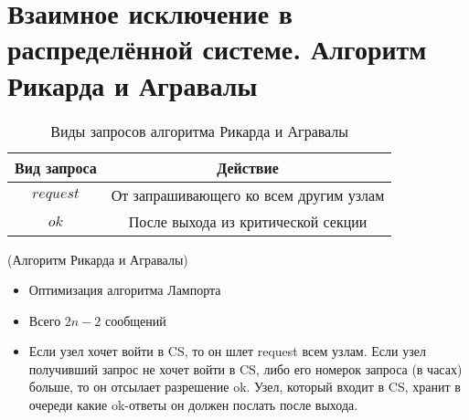 \section{Взаимное исключение в распределённой системе. Алгоритм Рикарда и Агравалы}

\begin{table}[!ht]
    \centering
    \begin{tabular}{|c|c|} \hline
    Вид запроса & Действие \\ \hline
    $request$ & От запрашивающего ко всем другим узлам\\ \hline
    $ok$ & После выхода из критической секции \\ \hline
    \end{tabular}
    \caption{Виды запросов алгоритма Рикарда и Агравалы}
\end{table}

\begin{algorithm}(Алгоритм Рикарда и Агравалы)
\begin{itemize}
    \item Оптимизация алгоритма Лампорта
    \item Всего $2n-2$ сообщений
    \item Если узел хочет войти в CS, то он шлет request всем узлам.
        Если узел получивший запрос не хочет войти в CS, либо его номерок запроса (в часах) больше, то он отсылает разрешение ok.
        Узел, который входит в CS, хранит в очереди какие ok-ответы он должен послать после выхода.
\end{itemize}
\end{algorithm}

